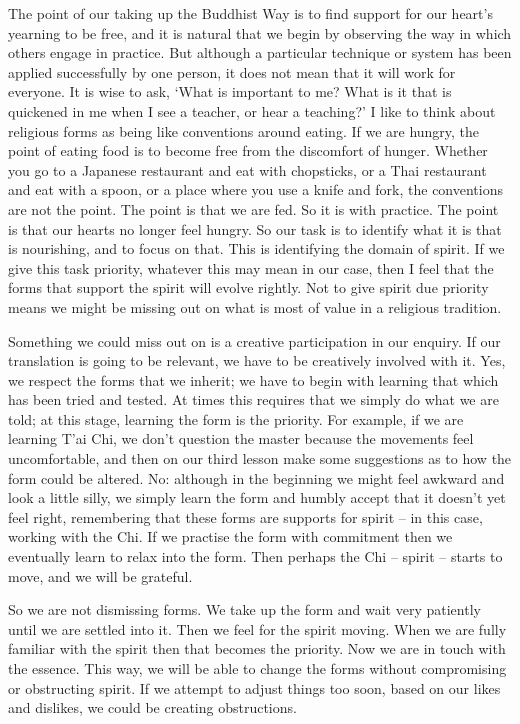 The point of our taking up the Buddhist Way is to find support for our
heart's yearning to be free, and it is natural that we begin by
observing the way in which others engage in practice. But although a
particular technique or system has been applied successfully by one
person, it does not mean that it will work for everyone. It is wise to
ask, `What is important to me? What is it that is quickened in me when I
see a teacher, or hear a teaching?' I like to think about religious
forms as being like conventions around eating. If we are hungry, the
point of eating food is to become free from the discomfort of hunger.
Whether you go to a Japanese restaurant and eat with chopsticks, or a
Thai restaurant and eat with a spoon, or a place where you use a knife
and fork, the conventions are not the point. The point is that we are
fed. So it is with practice. The point is that our hearts no longer feel
hungry. So our task is to identify what it is that is nourishing, and to
focus on that. This is identifying the domain of spirit. If we give this
task priority, whatever this may mean in our case, then I feel that the
forms that support the spirit will evolve rightly. Not to give spirit
due priority means we might be missing out on what is most of value in a
religious tradition.

Something we could miss out on is a creative participation in our
enquiry. If our translation is going to be relevant, we have to be
creatively involved with it. Yes, we respect the forms that we inherit;
we have to begin with learning that which has been tried and tested. At
times this requires that we simply do what we are told; at this stage,
learning the form is the priority. For example, if we are learning T'ai
Chi, we don't question the master because the movements feel
uncomfortable, and then on our third lesson make some suggestions as to
how the form could be altered. No: although in the beginning we might
feel awkward and look a little silly, we simply learn the form and
humbly accept that it doesn't yet feel right, remembering that these
forms are supports for spirit -- in this case, working with the Chi. If
we practise the form with commitment then we eventually learn to relax
into the form. Then perhaps the Chi -- spirit -- starts to move, and we
will be grateful.

So we are not dismissing forms. We take up the form and wait very
patiently until we are settled into it. Then we feel for the spirit
moving. When we are fully familiar with the spirit then that becomes the
priority. Now we are in touch with the essence. This way, we will be
able to change the forms without compromising or obstructing spirit. If
we attempt to adjust things too soon, based on our likes and dislikes,
we could be creating obstructions.


